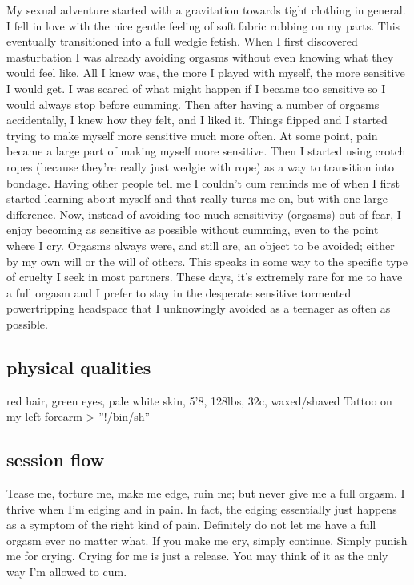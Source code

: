 \documentclass{article}
\begin{document}
My sexual adventure started with a gravitation towards tight clothing in general.
I fell in love with the nice gentle feeling of soft fabric rubbing on my parts.
This eventually transitioned into a full wedgie fetish.
When I first discovered masturbation I was already avoiding orgasms without even knowing what they would feel like.
All I knew was, the more I played with myself, the more sensitive I would get.
I was scared of what might happen if I became too sensitive so I would always stop before cumming.
Then after having a number of orgasms accidentally, I knew how they felt, and I liked it.
Things flipped and I started trying to make myself more sensitive much more often.
At some point, pain became a large part of making myself more sensitive.
Then I started using crotch ropes (because they're really just wedgie with rope) as a way to transition into bondage.
Having other people tell me I couldn't cum reminds me of when I first started learning about myself and that really turns me on, but with one large difference.
Now, instead of avoiding too much sensitivity (orgasms) out of fear, I enjoy becoming as sensitive as possible without cumming, even to the point where I cry.
Orgasms always were, and still are, an object to be avoided; either by my own will or the will of others.
This speaks in some way to the specific type of cruelty I seek in most partners.
These days, it's extremely rare for me to have a full orgasm and I prefer to stay in the desperate sensitive tormented powertripping headspace that I unknowingly avoided as a teenager as often as possible.

\subsection{physical qualities}

red hair, green eyes, pale white skin, 5'8, 128lbs, 32c, waxed/shaved
Tattoo on my left forearm \textgreater{} ''!/bin/sh''

\subsection{session flow}

Tease me, torture me, make me edge, ruin me; but never give me a full orgasm.
I thrive when I'm edging and in pain.
In fact, the edging essentially just happens as a symptom of the right kind of pain.
Definitely do not let me have a full orgasm ever no matter what.
If you make me cry, simply continue. Simply punish me for crying.
Crying for me is just a release. You may think of it as the only way I'm allowed to cum.
\end{document}
